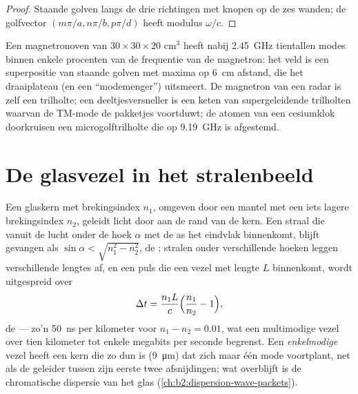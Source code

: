 \begin{proof}
Staande golven langs de drie richtingen met knopen op de zes wanden; de
golfvector $(m\pi/a, n\pi/b, p\pi/d)$ heeft modulus $\omega/c$.
\end{proof}

\begin{example}\label{ex:b2:guided-waves:cavities}
Een magnetronoven van $30 \times 30 \times 20$ cm$^3$ heeft nabij
\qty{2.45}{GHz} tientallen modes binnen enkele procenten van de frequentie
van de magnetron: het veld is een superpositie van staande golven met maxima
op \qty{6}{cm} afstand, die het draaiplateau (en een ``modemenger'')
uitsmeert. De magnetron van een radar is zelf een trilholte; een
deeltjesversneller is een keten van supergeleidende trilholten waarvan de
TM-mode de pakketjes voortduwt; de atomen van een cesiumklok doorkruisen een
microgolftrilholte die op \qty{9.19}{GHz} is afgestemd.
\end{example}

\section{De glasvezel in het stralenbeeld}

\begin{proposition}[Sprongindexvezel]\label{prop:b2:guided-waves:fibre}
Een glaskern met brekingsindex $n_1$, omgeven door een mantel met een iets
lagere brekingsindex $n_2$, geleidt licht door 
aan de rand van de kern. Een straal die vanuit de lucht onder de hoek
$\alpha$ met de as het eindvlak binnenkomt, blijft gevangen als
$\sin\alpha < \sqrt{n_1^2 - n_2^2}$, de \emph{}; stralen
onder verschillende hoeken leggen verschillende lengtes af, en een puls die
een vezel met lengte $L$ binnenkomt, wordt uitgespreid over
\[
\Delta t = \frac{n_1L}c\Bigl(\frac{n_1}{n_2} - 1\Bigr) ,
\]
de \emph{} --- zo'n \qty{50}{ns} per kilometer voor
$n_1
- n_2 = 0.01$, wat een multimodige vezel over tien kilometer tot enkele
megabits per seconde begrenst. Een \emph{enkelmodige} vezel heeft een kern
die zo dun is (\qty{9}{\micro m}) dat zich maar één mode voortplant, net als
de geleider tussen zijn eerste twee afsnijdingen; wat overblijft is de
chromatische dispersie van het glas (\cref{ch:b2:dispersion-wave-packets}).
\end{proposition}

